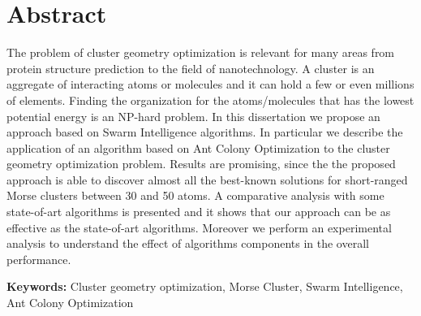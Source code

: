 \section*{\centering Abstract}
\renewcommand{\headrulewidth}{0pt}
\vspace{1cm}
	The problem of cluster geometry optimization is relevant for many areas from protein structure prediction to the field of nanotechnology. A cluster is an aggregate of interacting atoms or molecules and it can hold a few or even millions of elements. Finding the organization for the \mbox{atoms/molecules} that has the lowest potential energy is an NP-hard problem. In this dissertation we propose an approach based on Swarm Intelligence algorithms. In particular we describe the application of an algorithm based on Ant Colony Optimization to the cluster geometry optimization problem.
	Results are promising, since the the proposed approach is able to discover almost all the best-known solutions for short-ranged Morse clusters between 30 and 50 atoms. A comparative analysis with some state-of-art algorithms is presented and it shows that our approach can be as effective as the state-of-art algorithms. Moreover we perform an experimental analysis to understand the effect of algorithms components in the overall performance.
	
\vspace{0.5cm}
\textbf{Keywords:} Cluster geometry optimization, Morse Cluster, Swarm Intelligence, Ant Colony Optimization
